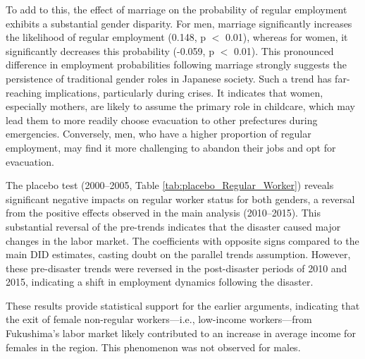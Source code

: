 \documentclass[a4paper,12pt]{article}
\begin{document}
To add to this, the effect of marriage on the probability of regular employment exhibits a substantial gender disparity. For men, marriage significantly increases the likelihood of regular employment (0.148, p $<$ 0.01), whereas for women, it significantly decreases this probability (-0.059, p $<$ 0.01). This pronounced difference in employment probabilities following marriage strongly suggests the persistence of traditional gender roles in Japanese society. Such a trend has far-reaching implications, particularly during crises. It indicates that women, especially mothers, are likely to assume the primary role in childcare, which may lead them to more readily choose evacuation to other prefectures during emergencies. Conversely, men, who have a higher proportion of regular employment, may find it more challenging to abandon their jobs and opt for evacuation.

The placebo test (2000--2005, Table \ref{tab:placebo_Regular_Worker}) reveals significant negative impacts on regular worker status for both genders, a reversal from the positive effects observed in the main analysis (2010--2015). This substantial reversal of the pre-trends indicates that the disaster caused major changes in the labor market. The coefficients with opposite signs compared to the main DID estimates, casting doubt on the parallel trends assumption. However, these pre-disaster trends were reversed in the post-disaster periods of 2010 and 2015, indicating a shift in employment dynamics following the disaster.

These results provide statistical support for the earlier arguments, indicating that the exit of female non-regular workers---i.e., low-income workers---from Fukushima's labor market likely contributed to an increase in average income for females in the region. This phenomenon was not observed for males.


\end{document}
